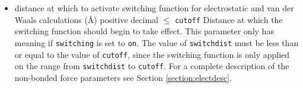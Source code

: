 \begin{itemize}


\item
{}%
{distance at which to activate switching function 
for electrostatic and van der Waals calculations (\AA)}%
{positive decimal $\leq$ \verb!cutoff!}%
{Distance at which the switching function
should begin to take effect.  
This parameter only has meaning if \verb!switching! is 
set to \verb!on!.  
The value of \verb!switchdist! must be less than
or equal to the value of \verb!cutoff!, since the switching function
is only applied on the range from \verb!switchdist! to \verb!cutoff!.  
For a complete description of the non-bonded force parameters see
Section \ref{section:electdesc}.}


\end{itemize}
